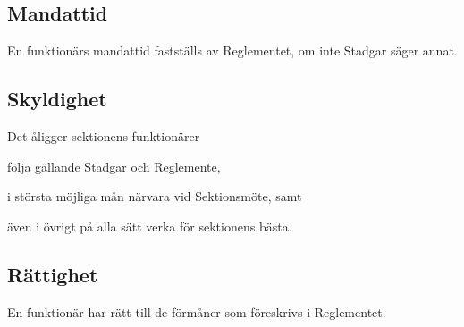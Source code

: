 \documentclass[10pt]{article}
\begin{document}
    \subsection{Mandattid}
    En funktionärs mandattid fastställs av Reglementet, om inte Stadgar säger
    annat.
    
    \subsection{Skyldighet}
    Det åligger sektionens funktionärer
    \begin{attlist}
    \item följa gällande Stadgar och Reglemente,
    \item i största möjliga mån närvara vid Sektionsmöte, samt
    \item även i övrigt på alla sätt verka för sektionens bästa.
    \end{attlist}
    
    \subsection{Rättighet}
    En funktionär har rätt till de förmåner som föreskrivs i Reglementet.
    \newpage
    
    
    
    
    
\end{document}
